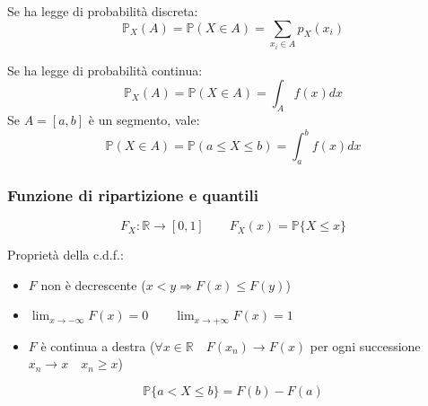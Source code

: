 \begin{definition}
	Se ha legge di probabilità discreta:
	\begin{equation}
		\mathbb{P}_X(A) = \mathbb{P}(X \in A) = \sum_{x_i \in A}p_X(x_i)
	\end{equation}
\end{definition}
\begin{definition}
	Se ha legge di probabilità continua:
	\begin{equation}
		\mathbb{P}_X(A) = \mathbb{P}(X \in A) = \int_{A} f(x)dx
	\end{equation}
	Se $A = [a,b]$ è un segmento, vale:
	\begin{equation}
		\mathbb{P}(X \in A) = \mathbb{P}(a \leq X \leq b) = \int_{a}^{b} f(x)dx
	\end{equation}
\end{definition}

\subsubsection{Funzione di ripartizione e quantili}
\begin{definition}
	\begin{equation}
		F_X : \mathbb{R} \to [0,1] \quad\quad F_X(x) = \mathbb{P}\{X \leq x\}
	\end{equation}
\end{definition}

\begin{proposition}
	Proprietà della c.d.f.:
	\begin{itemize}
		\item $F$ non è decrescente ($x < y \Rightarrow F(x) \leq F(y)$)
		\item $\lim_{x \to - \infty} F(x) = 0 \quad\quad \lim_{x \to + \infty}F(x)  = 1$
		\item $F$ è continua a destra ($\forall x \in \mathbb{R} \quad F(x_n) \to F(x)$ per ogni successione $x_n \to x \quad x_n \geq x$)
	\end{itemize}
\end{proposition}

\begin{proposition}
	\begin{equation}
		\mathbb{P}\{a < X \leq b\} = F(b) - F(a)
	\end{equation}
\end{proposition}

